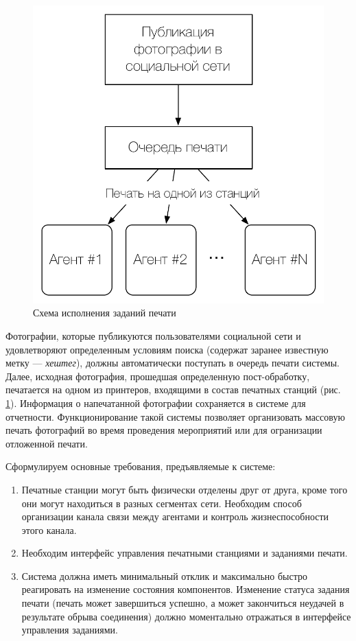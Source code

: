 \documentclass[a4paper,14pt,href]{article}
\begin{document}
\begin{figure}[htbp]
\begin{center}
  \includegraphics[scale=0.7]{print_schema.pdf}
    \caption{Схема исполнения заданий печати}
    \label{fig:PrintSchema}
\end{center}
\end{figure}

Фотографии, которые публикуются пользователями социальной сети и удовлетворяют определенным условиям поиска (содержат заранее известную метку --- \textit{хештег}), должны автоматически поступать в очередь печати системы. Далее, исходная фотография, прошедшая определенную пост-обработку, печатается на одном из принтеров, входящими в состав печатных станций (рис. \ref{fig:PrintSchema}). Информация о напечатанной фотографии сохраняется в системе для отчетности. Функционирование такой системы позволяет организовать массовую печать фотографий во время проведения мероприятий или для огранизации отложенной печати.

Сформулируем основные требования, предъявляемые к системе:
\begin{enumerate}
  \item Печатные станции могут быть физически отделены друг от друга, кроме того они могут находиться в разных сегментах сети. Необходим способ
    организации канала связи между агентами и контроль жизнеспособности этого канала.

  \item Необходим интерфейс управления печатными станциями и заданиями печати.

  \item Система должна иметь минимальный отклик и максимально быстро реагировать на изменение состояния компонентов. Изменение статуса задания печати (печать может завершиться успешно, а может закончиться неудачей в результате обрыва соединения) должно моментально отражаться в интерфейсе управления заданиями.
\end{enumerate}
\end{document}
